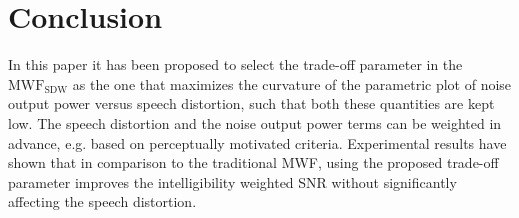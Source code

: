 \documentclass{article}
\begin{document}
\section{Conclusion}
\vspace{-0.05cm}
In this paper it has been proposed to select the trade-off parameter in the $\text{MWF}_{\text{SDW}}$ as the one that maximizes the curvature of the parametric plot of noise output power versus speech distortion, such that both these quantities are kept low.
The speech distortion and the noise output power terms can be weighted in advance, e.g. based on perceptually motivated criteria.
Experimental results have shown that in comparison to the traditional MWF, using the proposed trade-off parameter improves the intelligibility weighted SNR without significantly affecting the speech distortion.


\end{document}
